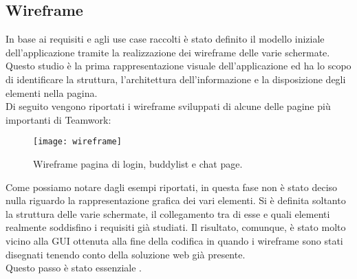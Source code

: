 \subsection{Wireframe}
In base ai requisiti e agli use case raccolti è stato definito il modello iniziale
 dell'applicazione tramite la realizzazione dei wireframe delle varie schermate. \\
Questo studio è la prima rappresentazione visuale dell'applicazione ed ha lo 
scopo di identificare la struttura, l'architettura dell'informazione e la 
disposizione degli elementi nella pagina.\\
Di seguito vengono riportati i wireframe sviluppati di alcune delle pagine più 
importanti di Teamwork:
\begin{figure}[H] 
	\centering
	\texttt{[image: wireframe]}
	\caption{Wireframe pagina di login, buddylist e chat page.}
\end{figure}
Come possiamo notare dagli esempi riportati, in questa fase non è stato deciso 
nulla riguardo la rappresentazione grafica dei vari elementi. 
Si è definita soltanto la struttura delle varie schermate, il collegamento tra 
di esse e quali elementi realmente soddisfino i requisiti già studiati. 
Il risultato, comunque, è stato molto vicino alla GUI ottenuta alla fine della 
codifica in quando i wireframe sono stati disegnati tenendo conto della 
soluzione web già presente.\\ 
Questo passo è stato essenziale .

